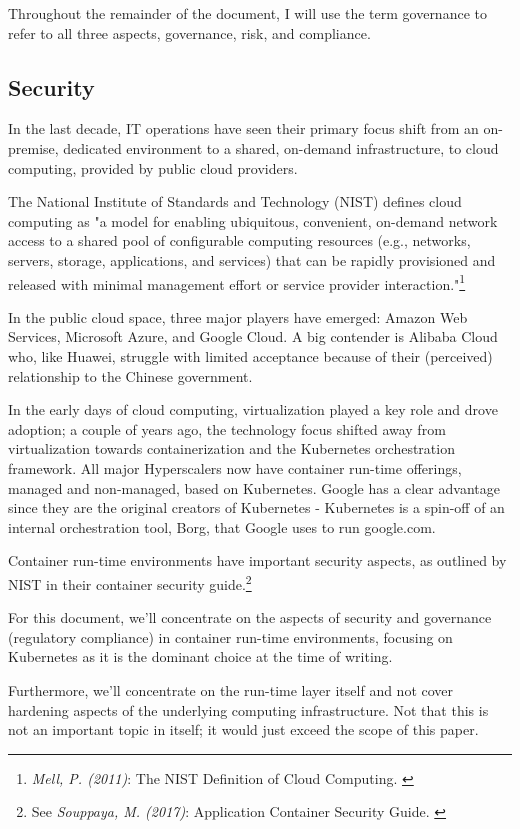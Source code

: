 Throughout the remainder of the document, I will use the term governance to refer to all three aspects, governance, risk, and compliance.

\subsection{Security}

In the last decade, IT operations have seen their primary focus shift from an on-premise, dedicated environment to a shared, on-demand infrastructure, to cloud computing, provided by public cloud providers.

The National Institute of Standards and Technology (NIST) defines cloud computing as "a model for enabling ubiquitous, convenient, on-demand network access to a shared pool of configurable computing resources (e.g., networks, servers, storage, applications, and services) that can be rapidly provisioned and released with minimal management effort or service provider interaction."\footnote{\textit{Mell, P. (2011)}: The NIST Definition of Cloud Computing. \cite{sp800-145}}

In the public cloud space, three major players have emerged: Amazon Web Services, Microsoft Azure, and Google Cloud. A big contender is Alibaba Cloud who, like Huawei, struggle with limited acceptance because of their (perceived) relationship to the Chinese government.

In the early days of cloud computing, virtualization played a key role and drove adoption; a couple of years ago, the technology focus shifted away from virtualization towards containerization and the Kubernetes orchestration framework. All major Hyperscalers now have container run-time offerings, managed and non-managed, based on Kubernetes. Google has a clear advantage since they are the original creators of Kubernetes - Kubernetes is a spin-off of an internal orchestration tool, Borg, that Google uses to run google.com.

Container run-time environments have important security aspects, as outlined by NIST in their container security guide.\footnote{See \textit{Souppaya, M. (2017)}: Application Container Security Guide. \cite{sp800-190}}

For this document, we'll concentrate on the aspects of security and governance (regulatory compliance) in container run-time environments, focusing on Kubernetes as it is the dominant choice at the time of writing.

Furthermore, we'll concentrate on the run-time layer itself and not cover hardening aspects of the underlying computing infrastructure. Not that this is not an important topic in itself; it would just exceed the scope of this paper.
